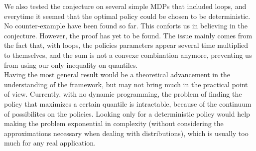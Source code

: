 We also tested the conjecture on several simple MDPs that included loops, and everytime it seemed that the optimal policy could be chosen to be deterministic. No counter-example have been found so far. This conforts us in believing in the conjecture. However, the proof has yet to be found. The issue mainly comes from the fact that, with loops, the policies parameters appear several time multiplied to themselves, and the sum is not a convexe combination anymore, preventing us from using our only inequality on quantiles.\\

Having the most general result would be a theoretical advancement in the understanding of the framework, but may not bring much in the practical point of view. Currently, with no dynamic programming, the problem of finding the policy that maximizes a certain quantile is intractable, because of the continuum of possibilites on the policies. Looking only for a deterministic policy would help making the problem exponential in complexity (without considering the approximations necessary when dealing with distributions), which is usually too much for any real application.